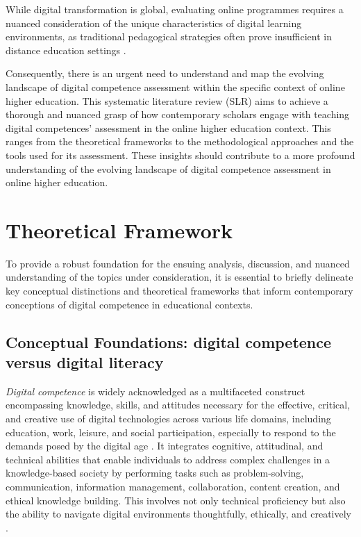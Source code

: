\documentclass[english]{textolivre}
\begin{document}
While digital transformation is global, evaluating online programmes requires a nuanced consideration of the unique characteristics of digital learning environments, as traditional pedagogical strategies often prove insufficient in distance education settings \cite{GarcesBastias2024}.

Consequently, there is an urgent need to understand and map the evolving landscape of digital competence assessment within the specific context of online higher education. This systematic literature review (SLR) aims to achieve a thorough and nuanced grasp of how contemporary scholars engage with teaching digital competences’ assessment in the online higher education context. This ranges from the theoretical frameworks to the methodological approaches and the tools used for its assessment. These insights should contribute to a more profound understanding of the evolving landscape of digital competence assessment in online higher education.

\section{Theoretical Framework}\label{sec-normas}
To provide a robust foundation for the ensuing analysis, discussion, and nuanced understanding of the topics under consideration, it is essential to briefly delineate key conceptual distinctions and theoretical frameworks that inform contemporary conceptions of digital competence in educational contexts.

\subsection{Conceptual Foundations: digital competence versus digital literacy}\label{sec-conduta}
\textit{Digital competence} is widely acknowledged as a multifaceted construct encompassing knowledge, skills, and attitudes necessary for the effective, critical, and creative use of digital technologies across various life domains, including education, work, leisure, and social participation, especially to respond to the demands posed by the digital age \cite{CouncilEU2018,Ferrari2013,redecker2017digcompedu}. It integrates cognitive, attitudinal, and technical abilities that enable individuals to address complex challenges in a knowledge-based society by performing tasks such as problem-solving, communication, information management, collaboration, content creation, and ethical knowledge building. This involves not only technical proficiency but also the ability to navigate digital environments thoughtfully, ethically, and creatively \cite{Falloon2020,sales2019cartografia,vuorikari2022digcomp22}.
\end{document}
